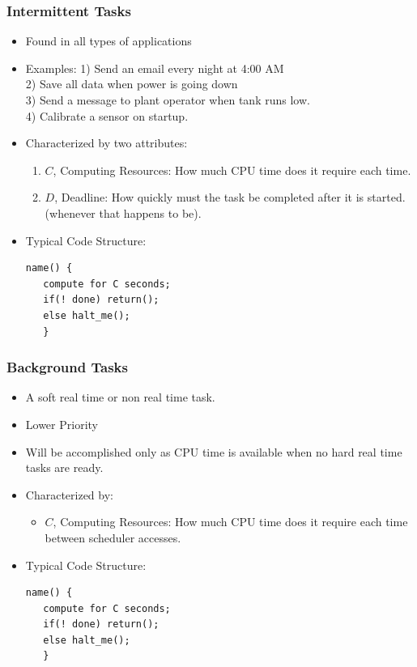 \documentclass{article}	%
\begin{document}
\subsubsection{Intermittent Tasks}
\begin{itemize}
        \item Found in  all types of applications
        \item Examples: 1) Send an email every night at 4:00 AM\\
        2) Save all data when power is going down \\
        3) Send a message to plant operator when tank runs low.\\
        4) Calibrate a sensor on startup.

        \item Characterized by two attributes:
                \begin{enumerate}
                        \item $C$, Computing Resources: How much CPU time  does it require each time.
                        \item $D$, Deadline: How quickly must the task be completed after it
is started. (whenever that happens to be).
                \end{enumerate}
         \item Typical Code Structure:
\begin{verbatim}
name() {
   compute for C seconds;
   if(! done) return();
   else halt_me();
   }
\end{verbatim}
\end{itemize}


\subsubsection{Background Tasks}
\begin{itemize}
        \item A soft real time or non real time task.
        \item Lower Priority
        \item Will be accomplished only as CPU time is available when no
        hard real time tasks are ready.
        \item Characterized by:
                \begin{itemize}
                         \item $C$, Computing Resources: How much CPU time  does
                         it require each time between scheduler accesses.
                \end{itemize}
         \item Typical Code Structure:
\begin{verbatim}
name() {
   compute for C seconds;
   if(! done) return();
   else halt_me();
   }
\end{verbatim}
\end{itemize}
\end{document}
